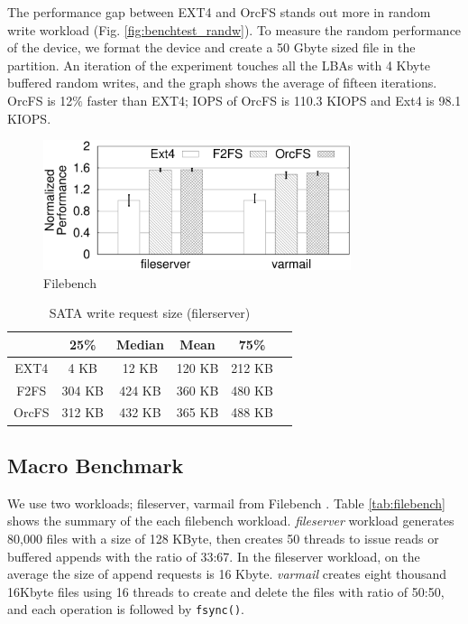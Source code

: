 \documentclass[prodmode,acmtecs]{acmsmall}
\begin{document}
The performance gap between EXT4 and OrcFS stands out more in random
write workload (Fig. \ref{fig:benchtest_randw}).  To measure the
random performance of the device, we format the device and create a 50
Gbyte sized file in the partition. An iteration of the experiment
touches all the LBAs with 4 Kbyte buffered random writes, and the
graph shows the average of fifteen iterations. OrcFS is 12$\%$ faster
than EXT4; IOPS of OrcFS is 110.3 KIOPS and Ext4 is 98.1 KIOPS.


\begin{figure}[t]
  \begin{center}
  \includegraphics[height=1.5in]{./bench/filebench.eps}
  \caption{Filebench}
  \label{fig:filebench}
  \end{center}
\end{figure}

\begin{table}[t]
\begin{center}
\begin{tabular}{|c|c|c|c|c|c|} \hline
  		& 25\%	& Median	& Mean	& 75\%   \\ \hline\hline
  EXT4	& 4 KB	& 12 KB	& 120 KB	& 212 KB \\ \hline
  F2FS 	& 304 KB	& 424 KB	& 360 KB	& 480 KB	\\ \hline
  OrcFS 	& 312 KB	& 432 KB	& 365 KB	& 488 KB 	\\ \hline
\end{tabular}
\end{center}
\caption{SATA write request size (filerserver)}
\label{tab:fileserver_size}
\end{table}

\subsection{Macro Benchmark}
\label{subsec:micro_bench}

We use two workloads; fileserver, varmail from Filebench
\cite{filebench}.  Table \ref{tab:filebench} shows the summary of the
each filebench workload.  \emph{fileserver} workload generates 80,000
files with a size of 128 KByte, then creates 50 threads to issue reads
or buffered appends with the ratio of 33:67. In the fileserver
workload, on the average the size of append requests is 16 Kbyte.
\emph{varmail} creates eight thousand 16Kbyte files using 16 threads
to create and delete the files with ratio of 50:50, and each operation
is followed by \texttt{fsync()}.
\end{document}
